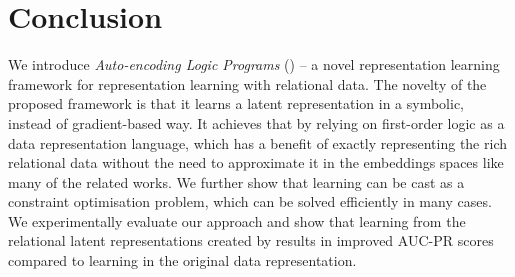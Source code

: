 \section{Conclusion}


We introduce \textit{Auto-encoding Logic Programs} () -- a novel representation learning framework for representation learning with relational data.
The novelty of the proposed framework is that it learns a latent representation in a symbolic, instead of gradient-based way.
It achieves that by relying on first-order logic as a data representation language, which has a benefit of exactly representing the rich relational data without the need to approximate it in the embeddings spaces like many of the related works.
We further show that learning  can be cast as a constraint optimisation problem, which can be solved efficiently in many cases.
We experimentally evaluate our approach and show that learning from the relational latent representations created by  results in improved AUC-PR scores compared to learning in the original data representation.


\cleardoublepage

